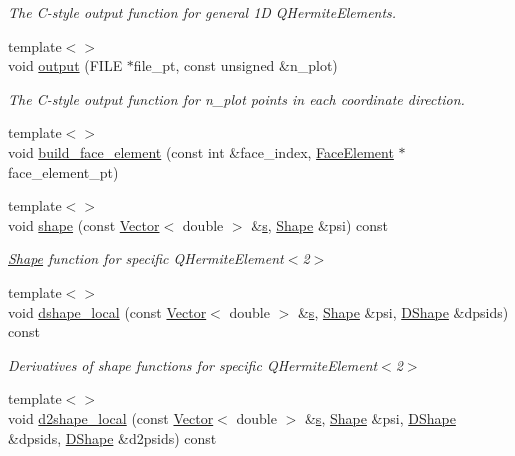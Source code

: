 \begin{DoxyCompactItemize}
\begin{DoxyCompactList}\small\item\em The C-\/style output function for general 1D Q\+Hermite\+Elements. \end{DoxyCompactList}\item 
{\footnotesize template$<$$>$ }\\void \hyperlink{classoomph_1_1QHermiteElement_a06e716f7fa8ed3e595089b88c68b1026}{output} (F\+I\+LE $\ast$file\+\_\+pt, const unsigned \&n\+\_\+plot)
\begin{DoxyCompactList}\small\item\em The C-\/style output function for n\+\_\+plot points in each coordinate direction. \end{DoxyCompactList}\item 
{\footnotesize template$<$$>$ }\\void \hyperlink{classoomph_1_1QHermiteElement_a221b1fae4565b47b34786cb0579000b3}{build\+\_\+face\+\_\+element} (const int \&face\+\_\+index, \hyperlink{classoomph_1_1FaceElement}{Face\+Element} $\ast$face\+\_\+element\+\_\+pt)
\item 
{\footnotesize template$<$$>$ }\\void \hyperlink{classoomph_1_1QHermiteElement_a46e93a6e3daf826f6d734e450da38899}{shape} (const \hyperlink{classoomph_1_1Vector}{Vector}$<$ double $>$ \&\hyperlink{cfortran_8h_ab7123126e4885ef647dd9c6e3807a21c}{s}, \hyperlink{classoomph_1_1Shape}{Shape} \&psi) const
\begin{DoxyCompactList}\small\item\em \hyperlink{classoomph_1_1Shape}{Shape} function for specific Q\+Hermite\+Element$<$2$>$ \end{DoxyCompactList}\item 
{\footnotesize template$<$$>$ }\\void \hyperlink{classoomph_1_1QHermiteElement_a0e7afb0634304e077928276302888d28}{dshape\+\_\+local} (const \hyperlink{classoomph_1_1Vector}{Vector}$<$ double $>$ \&\hyperlink{cfortran_8h_ab7123126e4885ef647dd9c6e3807a21c}{s}, \hyperlink{classoomph_1_1Shape}{Shape} \&psi, \hyperlink{classoomph_1_1DShape}{D\+Shape} \&dpsids) const
\begin{DoxyCompactList}\small\item\em Derivatives of shape functions for specific Q\+Hermite\+Element$<$2$>$ \end{DoxyCompactList}\item 
{\footnotesize template$<$$>$ }\\void \hyperlink{classoomph_1_1QHermiteElement_afc15c72626666d41a190ab183573354d}{d2shape\+\_\+local} (const \hyperlink{classoomph_1_1Vector}{Vector}$<$ double $>$ \&\hyperlink{cfortran_8h_ab7123126e4885ef647dd9c6e3807a21c}{s}, \hyperlink{classoomph_1_1Shape}{Shape} \&psi, \hyperlink{classoomph_1_1DShape}{D\+Shape} \&dpsids, \hyperlink{classoomph_1_1DShape}{D\+Shape} \&d2psids) const

\end{DoxyCompactItemize}
